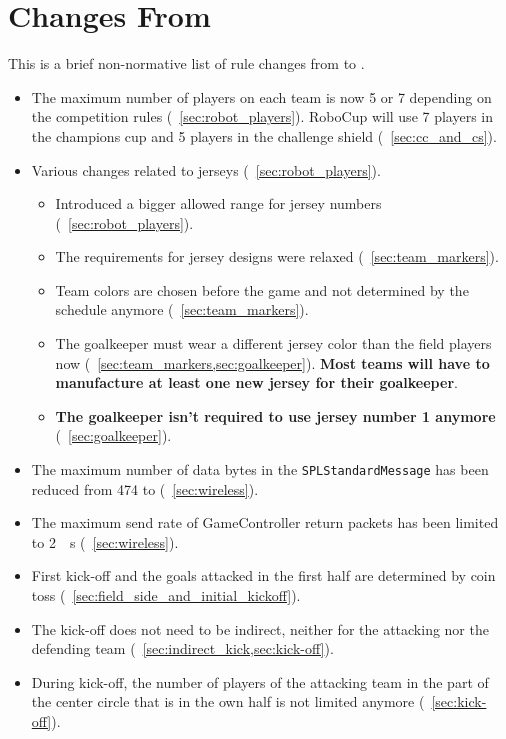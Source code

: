 \section{Changes From \LastRCYear}
This is a brief non-normative list of rule changes from \LastRCYear to \RCYear.

\begin{itemize}
  \item The maximum number of players on each team is now 5 or 7 depending on the competition rules (\cf~\cref{sec:robot_players}). RoboCup \RCYear will use 7 players in the champions cup and 5 players in the challenge shield (\cf~\cref{sec:cc_and_cs}).
  \item Various changes related to jerseys (\cf~\cref{sec:robot_players}).
  \begin{itemize}
    \item Introduced a bigger allowed range for jersey numbers (\cf~\cref{sec:robot_players}).
    \item The requirements for jersey designs were relaxed (\cf~\cref{sec:team_markers}).
    \item Team colors are chosen before the game and not determined by the schedule anymore (\cf~\cref{sec:team_markers}).
    \item The goalkeeper must wear a different jersey color than the field players now (\cf~\cref{sec:team_markers,sec:goalkeeper}). \textbf{Most teams will have to manufacture at least one new jersey for their goalkeeper}.
    \item \textbf{The goalkeeper isn't required to use jersey number 1 anymore} (\cf~\cref{sec:goalkeeper}).
  \end{itemize}
  \item The maximum number of data bytes in the \texttt{SPLStandardMessage} has been reduced from 474 to \TeamMessageDataSize{} (\cf~\cref{sec:wireless}).
  \item The maximum send rate of GameController return packets has been limited to \qty{2}{\per\second} (\cf~\cref{sec:wireless}).
  \item First kick-off and the goals attacked in the first half are determined by coin toss (\cf~\cref{sec:field_side_and_initial_kickoff}).
  \item The kick-off does not need to be indirect, neither for the attacking nor the defending team (\cf~\cref{sec:indirect_kick,sec:kick-off}).
  \item During kick-off, the number of players of the attacking team in the part of the center circle that is in the own half is not limited anymore (\cf~\cref{sec:kick-off}).

\end{itemize}
